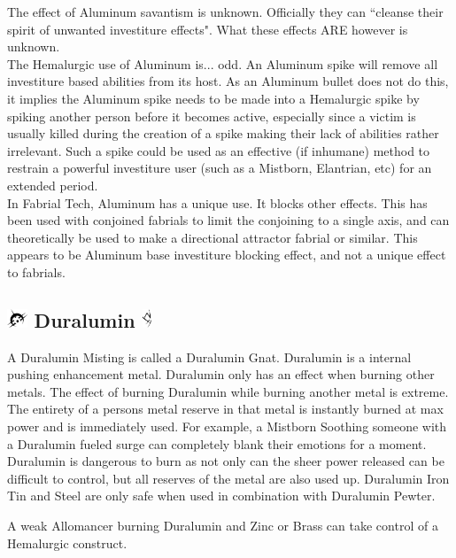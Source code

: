 \documentclass[conference]{IEEEtran}
\begin{document}
The effect of Aluminum savantism is unknown.  Officially they can ``cleanse their spirit of unwanted investiture effects".  What these effects ARE however is unknown. \\

The Hemalurgic use of Aluminum is... odd.  An Aluminum spike will remove all investiture based abilities from its host.  As an Aluminum bullet does not do this, it implies the Aluminum spike needs to be made into a Hemalurgic spike by spiking another person before it becomes active, especially since a victim is usually killed during the creation of a spike making their lack of abilities rather irrelevant.  Such a spike could be used as an effective (if inhumane) method to restrain a powerful investiture user (such as a Mistborn, Elantrian, etc) for an extended period.\\  

In Fabrial Tech, Aluminum has a unique use.  It blocks other effects.  This has been used with conjoined fabrials to limit the conjoining to a single axis, and can theoretically be used to make a directional attractor fabrial or similar.  This appears to be Aluminum base investiture blocking effect, and not a unique effect to fabrials.

\subsection*{\includegraphics[height=1em]{images/Duralumin.png}  Duralumin \includegraphics[height=1em]{images/Duralumin_(Feruchemy).png}}
A Duralumin Misting is called a Duralumin Gnat.  Duralumin is a internal pushing enhancement metal.  Duralumin only has an effect when burning other metals.  The effect of burning Duralumin while burning another metal is extreme.  The entirety of a persons metal reserve in that metal is instantly burned at max power and is immediately used.  For example, a Mistborn Soothing someone with a Duralumin fueled surge can completely blank their emotions for a moment.  Duralumin is dangerous to burn as not only can the sheer power released can be difficult to control, but all reserves of the metal are also used up.  Duralumin Iron Tin and Steel are only safe when used in combination with Duralumin Pewter.

A weak Allomancer burning Duralumin and Zinc or Brass can take control of a Hemalurgic construct.
\end{document}
